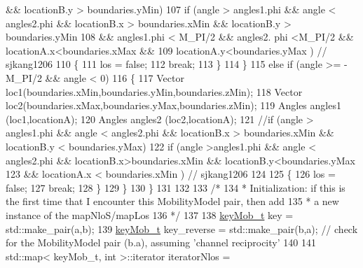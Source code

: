 \begin{DoxyCode}
{       && locationB.y > boundaries.yMin)}
107                         \textcolor{keywordflow}{if} (angle > angles1.phi && angle < angles2.phi && locationB.x > boundaries.xMin && 
      locationB.y > boundaries.yMin
108                                                                         && angles1.phi < M\_PI/2 && angles2.
      phi <M\_PI/2 && locationA.x<boundaries.xMax &&
109                                                                         locationA.y<boundaries.yMax ) \textcolor{comment}{//
      sjkang1206}
110                         \{
111                                 los = \textcolor{keyword}{false};
112                                 \textcolor{keywordflow}{break};
113                         \}
114                 \}
115                 \textcolor{keywordflow}{else} \textcolor{keywordflow}{if} (angle >= -M\_PI/2 && angle < 0)
116                 \{
117                         Vector loc1(boundaries.xMin,boundaries.yMin,boundaries.zMin);
118                         Vector loc2(boundaries.xMax,boundaries.yMax,boundaries.zMin);
119                         Angles angles1 (loc1,locationA);
120                         Angles angles2 (loc2,locationA);
121                         \textcolor{comment}{//if (angle > angles1.phi && angle < angles2.phi && locationB.x > boundaries.xMin
       && locationB.y < boundaries.yMax)}
122                         \textcolor{keywordflow}{if} (angle >angles1.phi && angle < angles2.phi && locationB.x>boundaries.xMin && 
      locationB.y<boundaries.yMax
123                                                                 && locationA.x < boundaries.xMin  ) \textcolor{comment}{//
      sjkang1206}
124 
125                         \{
126                                 los = \textcolor{keyword}{false};
127                                 \textcolor{keywordflow}{break};
128                         \}
129                 \}
130         \}
131 
132 
133         \textcolor{comment}{/*}
134 \textcolor{comment}{        * Initialization: if this is the first time that I encounter this MobilityModel pair, then add}
135 \textcolor{comment}{        * a new instance of the mapNloS/mapLos}
136 \textcolor{comment}{        */}
137 
138         \hyperlink{namespacens3_a9b2186a97262ddb040d3be19a4bed2f0}{keyMob\_t} key = std::make\_pair(a,b);
139         \hyperlink{namespacens3_a9b2186a97262ddb040d3be19a4bed2f0}{keyMob\_t} key\_reverse = std::make\_pair(b,a); \textcolor{comment}{// check for the MobilityModel pair (b.a),
       assuming 'channel reciprocity'}
140 
141         std::map< keyMob\_t, int >::iterator iteratorNlos =

\end{DoxyCode}
